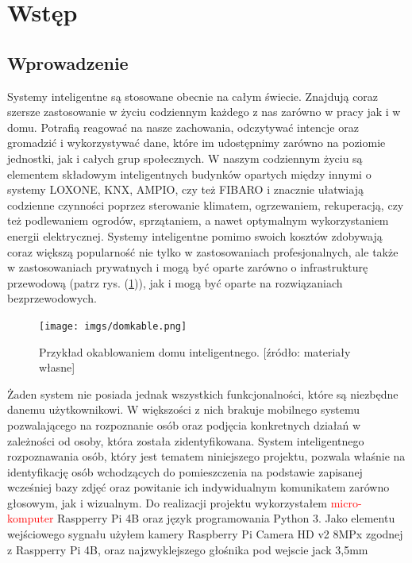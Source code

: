 \documentclass[a4paper,12pt,reqno]{article}
\begin{document}
%
%
\section{Wstęp}
\subsection{Wprowadzenie}
Systemy inteligentne są stosowane obecnie na całym świecie. Znajdują coraz szersze zastosowanie w życiu codziennym każdego z nas zarówno w pracy jak i w domu. Potrafią reagować na nasze zachowania, odczytywać intencje oraz gromadzić i wykorzystywać dane, które im udostępnimy zarówno na poziomie jednostki, jak i całych grup społecznych.
\newline
W naszym codziennym życiu są elementem składowym inteligentnych budynków opartych między innymi o systemy LOXONE, KNX, AMPIO, czy też FIBARO i znacznie ułatwiają codzienne czynności poprzez sterowanie klimatem, ogrzewaniem, rekuperacją, czy też podlewaniem ogrodów, sprzątaniem, a nawet optymalnym wykorzystaniem energii elektrycznej.
\newline
Systemy inteligentne pomimo swoich kosztów zdobywają coraz większą popularność nie tylko w zastosowaniach profesjonalnych, ale także w zastosowaniach prywatnych i mogą być oparte zarówno o infrastrukturę przewodową (patrz rys. (\ref{kable})), jak i mogą być oparte na rozwiązaniach bezprzewodowych.
\begin{figure}[!ht]%
\centering
\texttt{[image: imgs/domkable.png]}
\caption{Przykład okablowaniem domu inteligentnego. [źródło: materiały własne] \label{kable}}
\quad
\end{figure}
\newline
Żaden system nie posiada jednak wszystkich funkcjonalności, które są niezbędne danemu użytkownikowi. W większości z nich brakuje mobilnego systemu pozwalającego na rozpoznanie osób oraz podjęcia konkretnych działań w zależności od osoby, która została zidentyfikowana.
\newline
System inteligentnego rozpoznawania osób, który jest tematem niniejszego projektu, pozwala właśnie na identyfikację osób wchodzących do pomieszczenia na podstawie zapisanej wcześniej bazy zdjęć oraz powitanie ich indywidualnym komunikatem zarówno głosowym, jak i wizualnym.
\newline
Do realizacji projektu wykorzystałem \textcolor{red}{micro-komputer} Raspperry Pi 4B oraz język programowania Python 3. Jako elementu wejściowego sygnału użyłem kamery Raspberry Pi Camera HD v2 8MPx zgodnej z Raspperry Pi 4B, oraz najzwyklejszego głośnika pod wejscie jack 3,5mm
\end{document}
